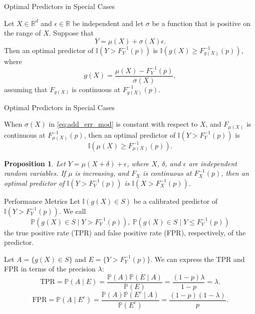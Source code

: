 \documentclass{beamer}
\newtheorem{proposition}{Proposition}
\def\I{\mathbb I}
\def\P{\mathbb P}
\def\R{\mathbb R}
\def\FPR{\text{FPR}}
\def\TPR{\text{TPR}}
\begin{document}
\begin{frame}{Optimal Predictors in Special Cases}
    \begin{theorem}
        Let $X \in \R^d$ and $\epsilon \in \R$ be independent and let $\sigma$ be a function that is positive on the range of $X$. Suppose that 
        \begin{equation}\label{eq:add_err_mod}
            Y = \mu(X) + \sigma(X)\epsilon.
        \end{equation}
        Then an optimal predictor of $\I(Y > F_Y^{-1}(p))$ is $\I(g(X) \ge F_{g(X)}^{-1}(p))$, where
        \[
        g(X) = \frac{\mu(X) - F_Y^{-1}(p)}{\sigma(X)},
        \]
        assuming that $F_{g(X)}$ is continuous at $F_{g(X)}^{-1}(p)$.
    \end{theorem}
\end{frame}

\begin{frame}{Optimal Predictors in Special Cases}
    \begin{corollary}
        When $\sigma(X)$ in \eqref{eq:add_err_mod} is constant with respect to $X$, and $F_{\mu(X)}$ is continuous at $F_{\mu(X)}^{-1}(p)$, then an optimal predictor of $\I(Y > F_Y^{-1}(p))$ is
        \[
        \I(\mu(X) \ge F_{\mu(X)}^{-1}(p)).
        \]
    \end{corollary}

    \begin{proposition}
        Let $Y = \mu(X + \delta) + \epsilon$, where $X$, $\delta$, and $\epsilon$ are independent random
        variables. If $\mu$ is increasing, and $F_X$ is continuous at $F_X^{-1}(p)$, then an optimal predictor of $\I(Y > F_Y^{-1}(p))$ is $\I(X > F_X^{-1}(p))$.
    \end{proposition}
\end{frame}

\begin{frame}{Performance Metrics}
    Let $\I(g(X) \in S)$ be a calibrated predictor of $\I(Y > F_Y^{-1}(p))$. We call
    \[
    \P(g(X) \in S \mid Y > F_Y^{-1}(p)), \ \P(g(X) \in S \mid Y \le F_Y^{-1}(p))
    \]
    the true positive rate (TPR) and false positive rate (FPR), respectively, of the predictor.

    \medskip
    
    Let $A = \{g(X) \in S\}$ and $E = \{Y > F_Y^{-1}(p)\}$. We can express the TPR and FPR in terms of the precision $\lambda$:
    \[
    \TPR = \P(A \mid E) = \frac{\P(A)\P(E \mid A)}{\P(E)} = \frac{(1 - p)\lambda}{1 - p} = \lambda.
    \]
    \[
    \FPR = \P(A \mid E^c) = \frac{\P(A)\P(E^c \mid A)}{\P(E^c)} = \frac{(1 - p)(1 - \lambda)}{p}.
    \]
\end{frame}
\end{document}
